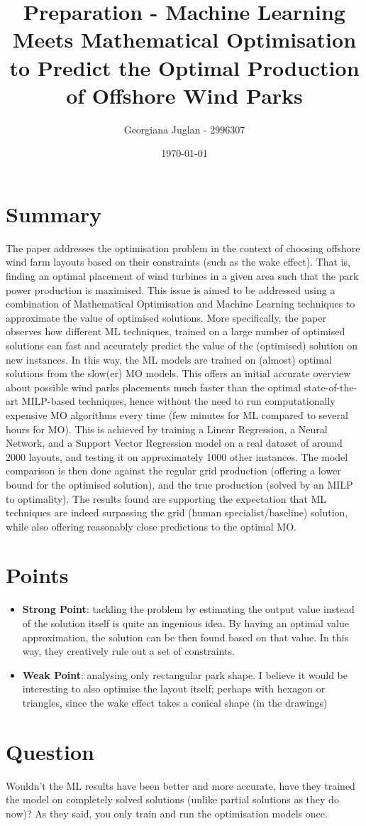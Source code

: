 \documentclass[11pt]{article}
\title{Preparation - Machine Learning Meets Mathematical Optimisation to Predict the Optimal Production of Offshore Wind Parks}
\author{Georgiana Juglan - 2996307}
\date{\today}
\begin{document}
\maketitle

\section{Summary}
The paper addresses the optimisation problem in the context of choosing offshore wind farm layouts based on their constraints (such as the wake effect). That is, finding an optimal placement of wind turbines in a given area such that the park power production is maximised. This issue is aimed to be addressed using a combination of Mathematical Optimisation and Machine Learning techniques to approximate the value of optimised solutions. More specifically, the paper observes how different ML techniques, trained on a large number of optimised solutions can fast and accurately predict the value of the (optimised) solution on new instances. In this way, the ML models are trained on (almost) optimal solutions from the slow(er) MO models. This offers an initial accurate overview about possible wind parks placements much faster than the optimal state-of-the-art MILP-based techniques, hence without the need to run computationally expensive MO algorithms every time (few minutes for ML compared to several hours for MO). This is achieved by training a Linear Regression, a Neural Network, and a Support Vector Regression model on a real dataset of around 2000 layouts, and testing it on approximately 1000 other instances. The model comparison is then done against the regular grid production (offering a lower bound for the optimised solution), and the true production (solved by an MILP to optimality). The results found are supporting the expectation that ML techniques are indeed surpassing the grid (human specialist/baseline) solution, while also offering reasonably close predictions to the optimal MO.

\section{Points}
    \begin{itemize}
        \item \textbf{Strong Point}: tackling the problem by estimating the output value instead of the solution itself is quite an ingenious idea. By having an optimal value approximation, the solution can be then found based on that value. In this way, they creatively rule out a set of constraints. %
        \item \textbf{Weak Point}: analysing only rectangular park shape. I believe it would be interesting to also optimise the layout itself; perhaps with hexagon or triangles, since the wake effect takes a conical shape (in the drawings)
    \end{itemize}

\section{Question}
Wouldn't the ML results have been better and more accurate, have they trained the model on completely solved solutions (unlike partial solutions as they do now)? As they said, you only train and run the optimisation models once.
\end{document}
